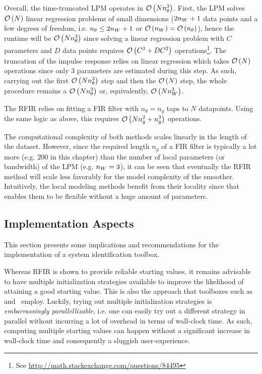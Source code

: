 
Overall, the time-truncated \gls{LPM} operates in $\mathcal{O} \left( N n_{\theta}^{3} \right)$.
First, the \gls{LPM} solves $\mathcal{O} \left( N \right)$ linear regression problems of small dimensions ($2n_{W} + 1$ data points and a few degrees of freedom, i.e. $n_{\theta} \leq 2 n_{W} + 1$ or $\mathcal{O} \left( n_{W} \right) = \mathcal{O} \left( n_{\theta} \right)$), hence the runtime will be $\mathcal{O} \left( N n_{\theta}^3 \right)$ since solving a linear regression problem with $C$ parameters and $D$ data points requires $\mathcal{O} \left( C^3  + D C^2 \right)$ operations\footnote{See \url{http://math.stackexchange.com/questions/84495}}.
The truncation of the impulse response relies on linear regression which takes $\mathcal{O} \left( N \right)$ operations since only $3$ parameters are estimated during this step.
As such, carrying out the first $\mathcal{O} \left( N n_{\theta}^3 \right)$ step and then the $\mathcal{O} \left( N \right)$ step, the whole procedure remains a $\mathcal{O} \left( N n_{\theta}^3 \right)$ or, equivalently, $\mathcal{O} \left( N n_{W}^3 \right)$.

The \gls{RFIR} relies on fitting a \gls{FIR} filter with $n_{\theta} = n_g$ taps to $N$ datapoints.
Using the same logic as above, this requires $\mathcal{O} \left( N n_{g}^2 + n_g^3 \right)$ operations.

The computational complexity  of both methods scales linearly in the length of the dataset.
However, since the required length $n_g$ of a \gls{FIR} filter is typically a lot more (e.g. $200$ in this chapter) than the number of local parameters (or bandwidth) of the \gls{LPM} (e.g. $n_{W} = 3$), it can be seen that eventually the \gls{RFIR} method will scale less favorably for the model complexity of the smoother.
Intuitively, the local modeling methods benefit from their locality since that enables them to be flexible without a huge amount of parameters.

\subsection{Implementation Aspects}
This section presents some implications and recommendations for the implementation of  a system identification toolbox.

Whereas \gls{RFIR} is shown to provide reliable starting values, it remains advisable to have multiple initialization strategies available to improve the likelihood of attaining a good starting value.
This is also the approach that toolboxes such as~\citep{FDIDENT} and~\citep{TDIDENT} employ.
Luckily, trying out multiple initialization strategies is \emph{embarrassingly parallellizable}, i.e. one can easily try out a different strategy in parallel without incurring a lot of overhead in terms of wall-clock time.
As such, computing multiple starting values can happen without a significant increase in wall-clock time and consequently a sluggish user-experience.

